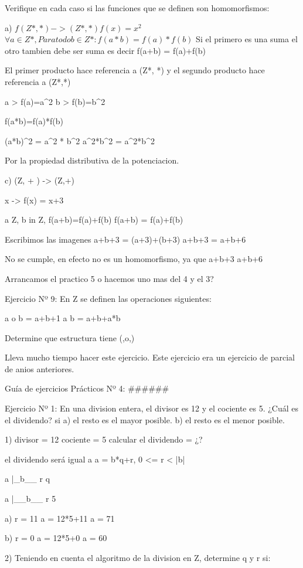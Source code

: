 Verifique en cada caso si las funciones que se definen son homomorfismos:

a) $f(Z* , * ) -> (Z *, *) f(x)=x^2$
$\forall a \in Z*, Para todo b \in Z* : f(a*b) = f(a)*f(b)$
Si el primero es una suma el otro tambien debe ser suma es decir
f(a+b) = f(a)+f(b)

El primer producto hace referencia a (Z*, *) y el segundo producto hace referencia a (Z*,*)


a > f(a)=a^2
b > f(b)=b^2

f(a*b)=f(a)*f(b)

(a*b)^2 = a^2 * b^2
a^2*b^2 = a^2*b^2

Por la propiedad distributiva de la potenciacion.


c) (Z, + ) -> (Z,+)

x -> f(x) = x+3


\forall a \in Z, \forall b in Z, f(a+b)=f(a)+f(b)
f(a+b) = f(a)+f(b)

Escribimos las imagenes
a+b+3 = (a+3)+(b+3)
a+b+3 = a+b+6

No se cumple, en efecto no es un homomorfismo, ya que a+b+3 \notequal a+b+6

Arrancamos el practico 5 o hacemos uno mas del 4 y el 3?


Ejercicio Nº 9:
En Z se definen las operaciones siguientes:

a o b = a+b+1
a \perp b = a+b+a*b

Determine que estructura tiene (,o,\perp)


Lleva mucho tiempo hacer este ejercicio.
Este ejercicio era un ejercicio de parcial de anios anteriores.


Guía de ejercicios Prácticos Nº 4:
######

Ejercicio Nº 1: En una division entera, el divisor es 12 y el cociente es 5. ¿Cuál es el dividendo? 
si a) el resto es el mayor posible. b) el resto es el menor posible.

1) divisor = 12
cociente = 5 
calcular el dividendo = ¿?

el dividendo será igual a 
a = b*q+r, 0 <= r < |b|


a |_b__
r  q

a |__b__
r  5


a) r = 11
a = 12*5+11
a = 71

b) r = 0
a = 12*5+0
a = 60 



2) Teniendo en cuenta el algoritmo de la division en Z, determine q y r si:

